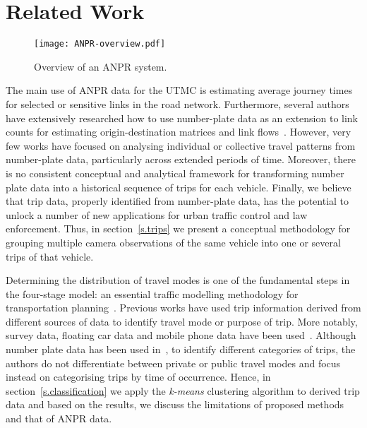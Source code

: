 \section{Related Work}
\label{s.related}

\begin{figure}[t]
\centering
\texttt{[image: ANPR-overview.pdf]}
\caption{Overview of an ANPR system.}
\label{fig:anpr-overview}
\vspace{-0.6cm}
\end{figure}

The main use of ANPR data for the UTMC is estimating average journey times for selected or sensitive links in the road network. Furthermore, several authors have extensively researched how to use number-plate data as an extension to link counts for estimating origin-destination matrices and link flows~\cite{Castillo2010, Castillo2008, Hazelton2012}. However, very few works have focused on analysing individual or collective travel patterns from number-plate data, particularly across extended periods of time. Moreover, there is no consistent conceptual and analytical framework for transforming number plate data into a historical sequence of trips for each vehicle. Finally, we believe that trip data, properly identified from number-plate data, has the potential to unlock a number of new applications for urban traffic control and law enforcement. Thus, in section~\ref{s.trips} we present a conceptual methodology for grouping multiple camera observations of the same vehicle into one or several trips of that vehicle.

Determining the distribution of travel modes is one of the fundamental steps in the four-stage model: an essential traffic modelling methodology for transportation planning~\cite{FourStepModel}. Previous works have used trip information derived from different sources of data to identify travel mode or purpose of trip. More notably, survey data, floating car data and mobile phone data have been used~\cite{ODMobileData, ClusteringGPS}.  Although number plate data has been used in~\cite{Clustering}, to identify different categories of trips, the authors do not differentiate between private or public travel modes and focus instead on categorising trips by time of occurrence. Hence, in section~\ref{s.classification} we apply the \emph{k-means} clustering algorithm to derived trip data and based on the results, we discuss the limitations of proposed methods and that of ANPR data.


